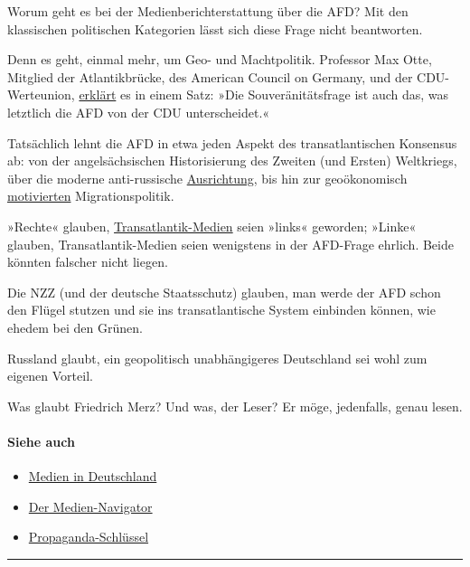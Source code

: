 Worum geht es bei der Medien­­bericht­­erstattung über die AFD? Mit den
klassischen politischen Kategorien lässt sich diese Frage nicht
beantworten.

Denn es geht, einmal mehr, um Geo- und Macht­politik. Professor Max
Otte, Mitglied der Atlantik­brücke, des American Council on Ger­ma­ny,
und der CDU-Werteunion,
\href{https://www.youtube.com/watch?v=9Ouns9KhQFQ}{erklärt} es in einem
Satz: »Die Souve­rä­­nitäts­­frage ist auch das, was letztlich die AFD
von der CDU unterscheidet.«

Tatsächlich lehnt die AFD in etwa jeden Aspekt des transatlantischen
Konsensus ab: von der angel­säch­sischen Histori­sierung des Zweiten
(und Ersten) Weltkriegs, über die moderne anti-russische
\href{https://www.t-online.de/region/id_87248174/linke-und-afd-kritisieren-militaermanoever-defender-2020-.html}{Ausrichtung},
bis hin zur geo­öko­no­misch
\href{https://swprs.org/migration-und-medien/}{motivierten}
Migrationspolitik.

»Rechte« glauben,
\href{https://swprs.org/netzwerk-medien-deutschland/}{Transatlantik-Medien}
seien »links« geworden; »Linke« glauben, Trans­at­lan­tik-Medien seien
wenigstens in der AFD-Frage ehrlich. Beide könnten falscher nicht
liegen.

Die NZZ (und der deutsche Staatsschutz) glau­ben, man werde der AFD
schon den Flügel stu­t­zen und sie ins transatlantische System
ein­bin­den können, wie ehedem bei den Grünen.

Russland glaubt, ein geopolitisch unab­hängi­ge­res Deutschland sei wohl
zum eigenen Vorteil.

Was glaubt Friedrich Merz? Und was, der Leser? Er möge, jedenfalls,
genau lesen.

\hypertarget{siehe-auch}{%
\paragraph{Siehe auch}\label{siehe-auch}}

\begin{itemize}
\tightlist
\item
  \href{https://swprs.org/netzwerk-medien-deutschland/}{Medien in
  Deutschland}
\item
  \href{https://swprs.org/medien-navigator/}{Der Medien-Navigator}
\item
  \href{https://swprs.org/der-propaganda-schluessel/}{Propaganda-Schlüssel}
\end{itemize}

\begin{center}\rule{0.5\linewidth}{\linethickness}\end{center}

